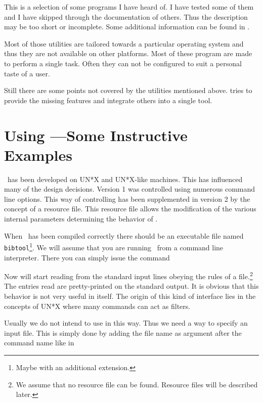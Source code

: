\documentclass[11pt,a4paper]{scrbook}
\begin{document}
This is a selection of some programs I have heard of. I have tested some of
them and I have skipped through the documentation of others. Thus the
description may be too short or incomplete. Some additional information can be
found in \cite[Chapter~13]{goosens.mittelbach.ea:companion}.

Most of those utilities are tailored towards a particular operating system and
thus they are not available on other platforms. Most of these program are made
to perform a single task. Often they can not be configured to suit a personal
taste of a user.

Still there are some points not covered by the utilities mentioned above.
\BibTool{} tries to provide the missing features and integrate others into a
single tool.


\section{Using \BibTool{}---Some Instructive Examples}

\BibTool\ has been developed on UN*X and UN*X-like machines. This has
influenced many of the design decisions. Version 1 was controlled using
numerous command line options. This way of controlling has been supplemented
in version 2 by the concept of a resource file. This resource file allows the
modification of the various internal parameters determining the behavior of
\BibTool.

When \BibTool\ has been compiled correctly there should be an executable file
named \texttt{bibtool}\footnote{Maybe with an additional extension.}. We will
assume that you are running \BibTool\ from a command line interpreter. There
you can simply issue the command

\sh{}

Now \BibTool{} will start reading from the standard input lines obeying the
rules of a \BibTeX{} file.\footnote{We assume that no resource file can be
  found. Resource files will be described later.} The entries read are
pretty-printed on the standard output. It is obvious that this behavior is not
very useful in itself. The origin of this kind of interface lies in the
concepts of UN*X where many commands can act as filters.

Usually we do not intend to use \BibTool{} in this way. Thus we need a way to
specify an input file. This is simply done by adding the file name as argument
after the command name like in
\end{document}

